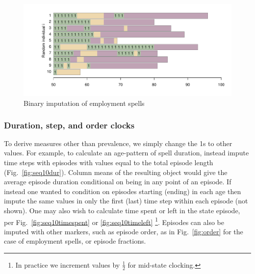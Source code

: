 \documentclass{article}
\begin{document}
\begin{figure}[ht!]
\centering
\includegraphics[scale=.5]{Figures/Seq10ones.pdf}
\caption{Binary imputation of employment spells}
\label{fig:seq10ones}
\end{figure}

\subsubsection{Duration, step, and order clocks}
To derive measures other than prevalence, we simply change the 1s to other values. For example, to calculate an age-pattern of spell duration, instead impute time steps with episodes with values equal to the total episode length (Fig.~\ref{fig:seq10dur}). Column means of the resulting object would give the average episode duration conditional on being in any point of an episode. If instead one wanted to condition on episodes starting (ending) in each age then impute the same values in only the first (last) time step within each episode (not shown). One may also wish to calculate time spent or left in the state episode, per Fig.~\ref{fig:seq10timespent} or \ref{fig:seq10timeleft} \footnote{In practice we increment values by $\frac{1}{2}$ for mid-state clocking.}. Episodes can also be imputed with other markers, such as episode order, as in Fig.~\ref{fig:order} for the case of employment spells, or episode fractions. 
\end{document}
